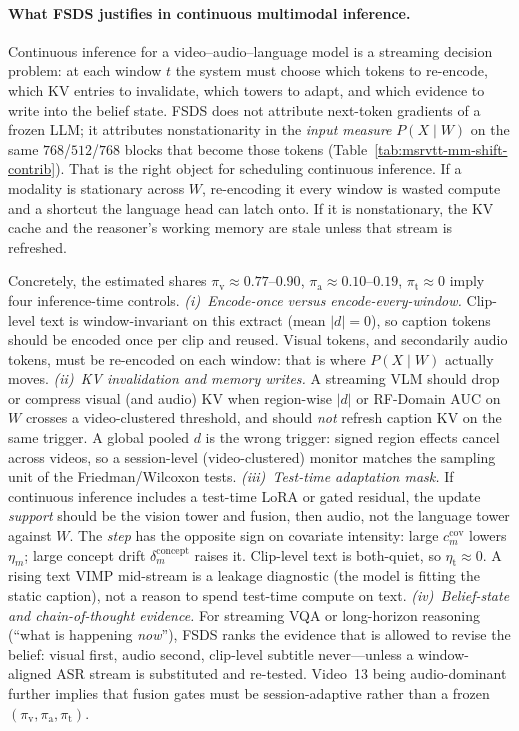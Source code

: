 
\paragraph{What FSDS justifies in continuous multimodal inference.}
Continuous inference for a video--audio--language model is a streaming decision problem: at each window $t$ the system must choose which tokens to re-encode, which KV entries to invalidate, which towers to adapt, and which evidence to write into the belief state.
FSDS does not attribute next-token gradients of a frozen LLM; it attributes nonstationarity in the \emph{input measure} $P(X\mid W)$ on the same $768$/$512$/$768$ blocks that become those tokens (Table~\ref{tab:msrvtt-mm-shift-contrib}).
That is the right object for scheduling continuous inference.
If a modality is stationary across $W$, re-encoding it every window is wasted compute and a shortcut the language head can latch onto.
If it is nonstationary, the KV cache and the reasoner's working memory are stale unless that stream is refreshed.

Concretely, the estimated shares $\pi_{\mathrm{v}}\approx 0.77$--$0.90$, $\pi_{\mathrm{a}}\approx 0.10$--$0.19$, $\pi_{\mathrm{t}}\approx 0$ imply four inference-time controls.
\emph{(i)~Encode-once versus encode-every-window.}
Clip-level text is window-invariant on this extract (mean $|d|=0$), so caption tokens should be encoded once per clip and reused.
Visual tokens, and secondarily audio tokens, must be re-encoded on each window: that is where $P(X\mid W)$ actually moves.
\emph{(ii)~KV invalidation and memory writes.}
A streaming VLM should drop or compress visual (and audio) KV when region-wise $|d|$ or RF-Domain AUC on $W$ crosses a video-clustered threshold, and should \emph{not} refresh caption KV on the same trigger.
A global pooled $d$ is the wrong trigger: signed region effects cancel across videos, so a session-level (video-clustered) monitor matches the sampling unit of the Friedman/Wilcoxon tests.
\emph{(iii)~Test-time adaptation mask.}
If continuous inference includes a test-time LoRA or gated residual, the update \emph{support} should be the vision tower and fusion, then audio, not the language tower against $W$.
The \emph{step} has the opposite sign on covariate intensity: large $c_m^{\mathrm{cov}}$ lowers $\eta_m$; large concept drift $\delta_m^{\mathrm{concept}}$ raises it.
Clip-level text is both-quiet, so $\eta_{\mathrm{t}}\approx 0$.
A rising text VIMP mid-stream is a leakage diagnostic (the model is fitting the static caption), not a reason to spend test-time compute on text.
\emph{(iv)~Belief-state and chain-of-thought evidence.}
For streaming VQA or long-horizon reasoning (``what is happening \emph{now}''), FSDS ranks the evidence that is allowed to revise the belief: visual first, audio second, clip-level subtitle never---unless a window-aligned ASR stream is substituted and re-tested.
Video~13 being audio-dominant further implies that fusion gates must be session-adaptive rather than a frozen $(\pi_{\mathrm{v}},\pi_{\mathrm{a}},\pi_{\mathrm{t}})$.

